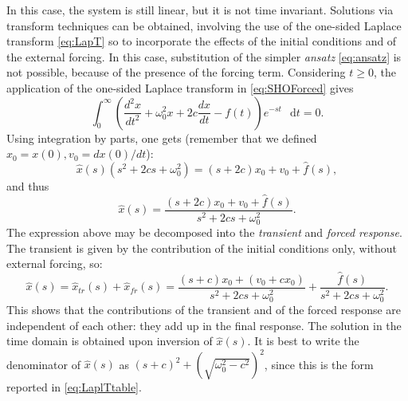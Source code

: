 \documentclass[11pt,twoside,a4paper,english]{book}
\newcommand{\dif}{\mathop{}\!\mathrm{d}}
\begin{document}
In this case, the system is still linear, but it is not time invariant. Solutions via transform techniques can be obtained, involving the use of the one-sided Laplace transform \eqref{eq:LapT} so to incorporate the effects of the initial conditions and  of the external forcing. In this case, substitution of the simpler \emph{ansatz} \eqref{eq:ansatz} is not possible, because of the presence of the forcing term. Considering $t\geq 0$, the application of the one-sided Laplace transform in \eqref{eq:SHOForced} gives
\begin{equation}
    \int_0^{\infty} \left( \frac{d^2 x}{dt^2} + \omega_0^2 x + 2c \frac{dx}{dt} - f(t)\right)e^{-st} \, \dif t = 0.
\end{equation}
Using integration by parts, one gets (remember that we defined $x_0 = x(0), v_0 = dx(0)/dt$):
\begin{equation}
    \hat x(s)\left( s^2 + 2cs + \omega_0^2\right) = (s+2c)x_0 + v_0 + \hat{f}(s),
\end{equation}
and thus
\begin{equation}
    \hat x(s) = \frac{(s+2c)x_0 + v_0 + \hat{f}(s)}{s^2 + 2cs + \omega_0^2}.
\end{equation}
The expression above may be decomposed into the \emph{transient} and \emph{forced response}. The transient is given by the contribution of the initial conditions only, without external forcing, so:
\begin{equation}
    \hat x(s) = \hat x_{tr}(s) + \hat x_{fr}(s) = \frac{(s+c)x_0 + (v_0 + cx_0)}{s^2 + 2cs + \omega_0^2} + \frac{\hat{f}(s)}{s^2 + 2cs + \omega_0^2}.
\end{equation}
This shows that the contributions of the transient and of the forced response are independent of each other: they add up in the final response. The solution in the time domain is obtained upon inversion of $\hat x(s).$  It is best to write the denominator of $\hat x(s)$ as $(s+c)^2 + \left(\sqrt{\omega_0^2-c^2}\right)^2$, since this is the form reported in \eqref{eq:LaplTtable}.
\end{document}
